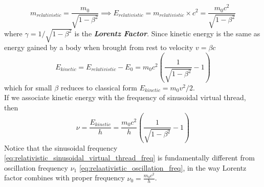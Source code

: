 \documentclass[11pt, a4paper]{article}
\begin{document}
	\begin{equation}\label{eq:relativistic_mass_and_energy}
		m_{relativistic} = \frac{m_{0}}{\sqrt{1 - \beta^{2}}} \implies E_{relativistic} = m_{relativistic} \times c^{2} = \frac{m_{0}c^{2}}{\sqrt{1 - \beta^{2}}}
	\end{equation}
	where $\gamma = 1/\sqrt{1 - \beta^{2}}$ is the \textbf{\textit{Lorentz Factor}}. 
	Since kinetic energy is the same as energy gained by a body when brought from rest to velocity $v=\beta c$
	\begin{equation}\label{eq:relativistic_kinetic_energy}
		E_{kinetic} = E_{relativistic} - E_{0} = m_{0}c^{2} \left(\frac{1}{\sqrt{1 - \beta^{2}}} - 1 \right)
	\end{equation}
	which for small $\beta$ reduces to classical form $E_{kinetic} = m_{0}v^{2}/2$.\\ 
	If we associate kinetic energy with the frequency of sinusoidal virtual thread, then
	\begin{equation}\label{eq:relativistic_sinusoidal_virtual_thread_freq}
		\nu = \frac{E_{kinetic}}{h} = \frac{m_{0}c^{2}}{h} \left(\frac{1}{\sqrt{1 - \beta^{2}}} - 1\right)
	\end{equation}
	Notice that the sinusoidal frequency \eqref{eq:relativistic_sinusoidal_virtual_thread_freq} is fundamentally different from oscillation frequency $\nu_{1}$ \eqref{eq:relaativistic_oscillation_freq}, in the way Lorentz factor combines with proper frequency $\nu_{0}=\frac{m_{0}c^{2}}{h}$.
	
\end{document}
